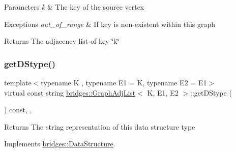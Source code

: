 \begin{DoxyParams}{Parameters}
{\em k} & The key of the source vertex \\
\hline
\end{DoxyParams}

\begin{DoxyExceptions}{Exceptions}
{\em out\+\_\+of\+\_\+range} & If key is non-\/existent within this graph\\
\hline
\end{DoxyExceptions}
\begin{DoxyReturn}{Returns}
The adjacency list of key \char`\"{}k\char`\"{} 
\end{DoxyReturn}
\mbox{\label{classbridges_1_1_graph_adj_list_ab1aeeed39ac0e0f66a677e7b0e722030}} 
\subsubsection{\texorpdfstring{get\+D\+Stype()}{getDStype()}}
{\footnotesize\ttfamily template$<$typename K , typename E1  = K, typename E2  = E1$>$ \\
virtual const string \mbox{\hyperlink{classbridges_1_1_graph_adj_list}{bridges\+::\+Graph\+Adj\+List}}$<$ K, E1, E2 $>$\+::get\+D\+Stype (\begin{DoxyParamCaption}{ }\end{DoxyParamCaption}) const\hspace{0.3cm}{\ttfamily [inline]}, {\ttfamily [override]}, {\ttfamily [virtual]}}

\begin{DoxyReturn}{Returns}
The string representation of this data structure type 
\end{DoxyReturn}


Implements \mbox{\hyperlink{classbridges_1_1_data_structure_a957a63b106e340bc753620c650632bdc}{bridges\+::\+Data\+Structure}}.

\mbox{\label{classbridges_1_1_graph_adj_list_a3e4b21d0ff4b277502b2bb10e57df3c7}} 
